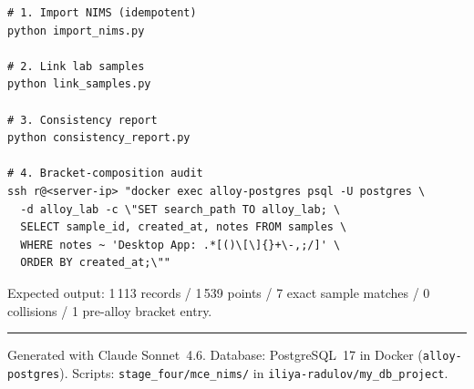 \documentclass[11pt,a4paper]{article}
\newcommand{\snap}{\textit{Snapshot~v1}}
\begin{document}
\begin{lstlisting}[style=terminal, caption={Commands to reproduce \snap{} from scratch.}]
# 1. Import NIMS (idempotent)
python import_nims.py

# 2. Link lab samples
python link_samples.py

# 3. Consistency report
python consistency_report.py

# 4. Bracket-composition audit
ssh r@<server-ip> "docker exec alloy-postgres psql -U postgres \
  -d alloy_lab -c \"SET search_path TO alloy_lab; \
  SELECT sample_id, created_at, notes FROM samples \
  WHERE notes ~ 'Desktop App: .*[()\[\]{}+\-,;/]' \
  ORDER BY created_at;\""
\end{lstlisting}

Expected output: 1\,113 records / 1\,539 points / 7 exact sample matches /
0 collisions / 1 pre-alloy bracket entry.

\vspace{6mm}\hrule\vspace{3mm}
{\small\color{tgray}
  Generated with Claude Sonnet~4.6.
  Database: PostgreSQL~17 in Docker (\texttt{alloy-postgres}).
  Scripts: \texttt{stage\_four/mce\_nims/} in \texttt{iliya-radulov/my\_db\_project}.
}
\end{document}
